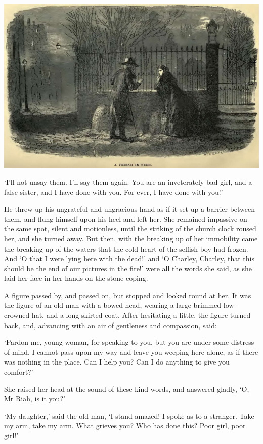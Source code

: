 \includegraphics[scale=2.3]{02-15-01}

‘I’ll not unsay them. I’ll say them again. You are an inveterately bad
girl, and a false sister, and I have done with you. For ever, I have
done with you!’

He threw up his ungrateful and ungracious hand as if it set up a barrier
between them, and flung himself upon his heel and left her. She remained
impassive on the same spot, silent and motionless, until the striking
of the church clock roused her, and she turned away. But then, with the
breaking up of her immobility came the breaking up of the waters that
the cold heart of the selfish boy had frozen. And ‘O that I were lying
here with the dead!’ and ‘O Charley, Charley, that this should be the
end of our pictures in the fire!’ were all the words she said, as she
laid her face in her hands on the stone coping.

A figure passed by, and passed on, but stopped and looked round at
her. It was the figure of an old man with a bowed head, wearing a large
brimmed low-crowned hat, and a long-skirted coat. After hesitating a
little, the figure turned back, and, advancing with an air of gentleness
and compassion, said:

‘Pardon me, young woman, for speaking to you, but you are under some
distress of mind. I cannot pass upon my way and leave you weeping here
alone, as if there was nothing in the place. Can I help you? Can I do
anything to give you comfort?’

She raised her head at the sound of these kind words, and answered
gladly, ‘O, Mr Riah, is it you?’

‘My daughter,’ said the old man, ‘I stand amazed! I spoke as to a
stranger. Take my arm, take my arm. What grieves you? Who has done this?
Poor girl, poor girl!’

